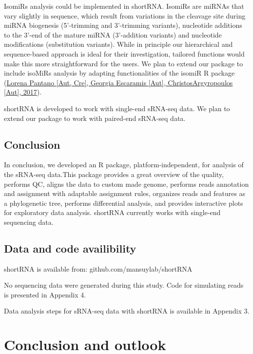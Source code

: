 \documentclass[12pt,twoside]{reedthesis}
\begin{document}
IsomiRs analysis could be implemented in shortRNA. IsomiRs are miRNAs
that vary slightly in sequence, which result from variations in the
cleavage site during miRNA biogenesis (5'-trimming and 3'-trimming
variants), nucleotide additions to the 3'-end of the mature miRNA
(3'-addition variants) and nucleotide modifications (substitution
variants). While in principle our hierarchical and sequence-based
approach is ideal for their investigation, tailored functions would make
this more straightforward for the users. We plan to extend our package
to include isoMiRs analysis by adapting functionalities of the isomiR R
package
(\protect\hyperlink{ref-lorenapantanoautcregeorgiaescaramisautchristosargyropoulosaut2017}{Lorena Pantano {[}Aut, Cre{]}, Georgia Escaramis {[}Aut{]}, ChristosArgyropoulos {[}Aut{]}, 2017}).

shortRNA is developed to work with single-end sRNA-seq data. We plan to
extend our package to work with paired-end sRNA-seq data.

\hypertarget{conclusion}{%
\section{Conclusion}\label{conclusion}}

In conclusion, we developed an R package, platform-independent, for
analysis of the sRNA-seq data.This package provides a great overview of
the quality, performs QC, aligns the data to custom made genome,
performs reads annotation and assignment with adaptable assignment
rules, organizes reads and features as a phylogenetic tree, performs
differential analysis, and provides interactive plots for exploratory
data analysis. shortRNA currently works with single-end sequencing data.

\hypertarget{data-and-code-availibility}{%
\section{Data and code availibility}\label{data-and-code-availibility}}

shortRNA is available from: github.com/mansuylab/shortRNA

No sequencing data were generated during this study. Code for simulating
reads is presented in Appendix 4.

Data analysis steps for sRNA-seq data with shortRNA is available in
Appendix 3.

\hypertarget{conclusion}{%
\chapter*{Conclusion and outlook}\label{conclusion}}
\end{document}
